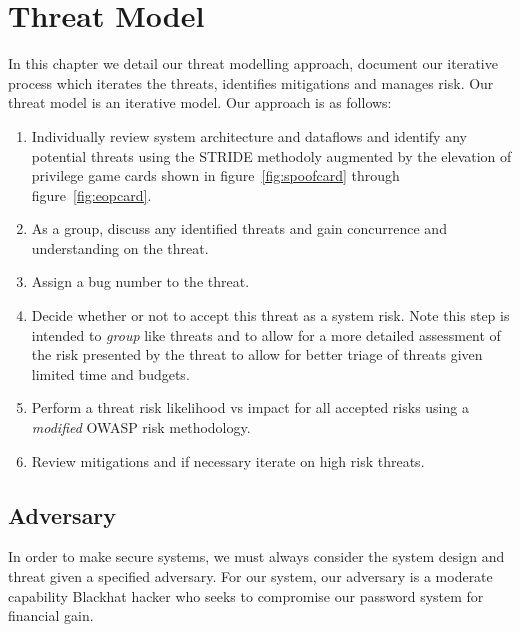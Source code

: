 \chapter{Threat Model}
\label{ch:threatmodel}
In this chapter we detail our threat modelling approach, document our iterative process which iterates the threats, identifies mitigations and manages risk.  Our threat model is an iterative model.  Our approach is as follows:
\begin{enumerate}
    \item{Individually review system architecture and dataflows and identify any potential threats using the STRIDE methodoly augmented by the elevation of privilege game cards shown in figure~\ref{fig:spoofcard} through figure~\ref{fig:eopcard}.}
    \item{As a group, discuss any identified threats and gain concurrence and understanding on the threat.}
    \item{Assign a bug number to the threat.}
    \item{Decide whether or not to accept this threat as a system risk.  Note this step is intended to \emph{group} like threats and to allow for a more detailed assessment of the risk presented by the threat to allow for better triage of threats given limited time and budgets.}
    \item{Perform a threat risk likelihood vs impact for all accepted risks using a \emph{modified} OWASP risk methodology.}
    \item{Review mitigations and if necessary iterate on high risk threats.}
\end{enumerate}


\section{Adversary}
\label{sec:adversary}
In order to make secure systems, we must always consider the system design and threat given a specified adversary.  For our system, our adversary is a moderate capability Blackhat hacker who seeks to compromise our password system for financial gain.

